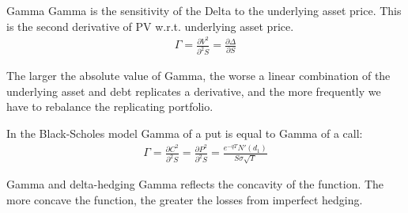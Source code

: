 \documentclass{beamer}
\begin{document}
\begin{frame}{Gamma}
\justify
\alert{Gamma} is the sensitivity of the Delta to the underlying asset price. This is the second derivative of PV w.r.t. underlying asset price.
\begin{align*}
\Gamma = \frac{\partial V^2}{\partial^2 S} = \frac{\partial \Delta}{\partial S}
\end{align*}

\justify
The larger the absolute value of Gamma, the worse a linear combination of the underlying asset and debt replicates a derivative, and the more frequently we have to rebalance the replicating portfolio.

\justify
In the Black-Scholes model Gamma of a put is equal to Gamma of a call:
\begin{align*}
\Gamma = \frac{\partial C^2}{\partial^2 S} = \frac{\partial P^2}{\partial^2 S} =
\frac{e^{-qT}N'(d_1)}{S\sigma\sqrt{T}} 
\end{align*} 
\end{frame}



\begin{frame}{Gamma and delta-hedging}
\justify
Gamma reflects the concavity of the function. The more concave the function, the greater the losses from imperfect hedging.

\centering
{}
\end{frame}
\end{document}
